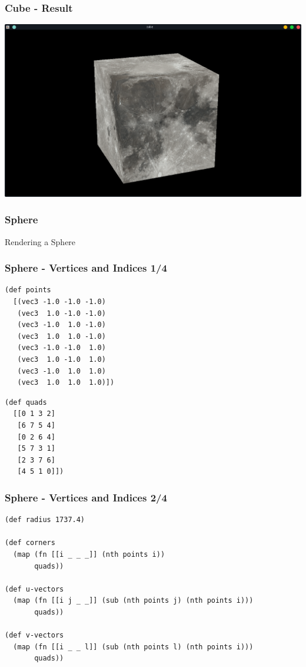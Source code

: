 \documentclass[aspectratio=169,11pt,xcolor=dvipsnames]{beamer}
\begin{document}
\begin{frame}
  \frametitle{Cube {-} Result}
  \begin{center}
    \includegraphics[width=.8\textwidth]{cube}
  \end{center}
\end{frame}

\begin{frame}
  \frametitle{Sphere}
  \begin{center}
    \begin{huge}
      Rendering a Sphere
    \end{huge}
  \end{center}
\end{frame}

\begin{frame}[fragile]
  \frametitle{Sphere {-} Vertices and Indices 1/4}
  \begin{minipage}[t]{.48\textwidth}
    \begin{verbatim}
(def points
  [(vec3 -1.0 -1.0 -1.0)
   (vec3  1.0 -1.0 -1.0)
   (vec3 -1.0  1.0 -1.0)
   (vec3  1.0  1.0 -1.0)
   (vec3 -1.0 -1.0  1.0)
   (vec3  1.0 -1.0  1.0)
   (vec3 -1.0  1.0  1.0)
   (vec3  1.0  1.0  1.0)])
    \end{verbatim}
  \end{minipage}
  \begin{minipage}[t]{.48\textwidth}
    \begin{verbatim}
(def quads
  [[0 1 3 2]
   [6 7 5 4]
   [0 2 6 4]
   [5 7 3 1]
   [2 3 7 6]
   [4 5 1 0]])
    \end{verbatim}
  \end{minipage}
\end{frame}

\begin{frame}[fragile]
  \frametitle{Sphere {-} Vertices and Indices 2/4}
  \begin{verbatim}
(def radius 1737.4)

(def corners
  (map (fn [[i _ _ _]] (nth points i))
       quads))

(def u-vectors
  (map (fn [[i j _ _]] (sub (nth points j) (nth points i)))
       quads))

(def v-vectors
  (map (fn [[i _ _ l]] (sub (nth points l) (nth points i)))
       quads))
  \end{verbatim}
\end{frame}
\end{document}
